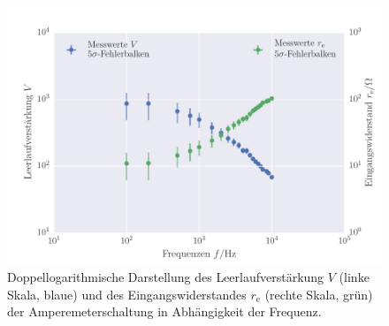 \FloatBarrier
\begin{figure}[!h]
\centering
\includegraphics[scale=1]{../Grafiken/Amperemeter_Leerlaufverstaerkung_Eingangswiderstand.pdf}
\caption{Doppellogarithmische Darstellung des Leerlaufverstärkung $V$ (linke Skala, blaue) und des
	Eingangswiderstandes $r_{\mathrm{e}}$
	(rechte Skala, grün) der Amperemeterschaltung in Abhängigkeit der
	Frequenz.\label{fig:amperemeter_leerlaufverstaerkung_eingangswiderstand}}
\end{figure}
\FloatBarrier